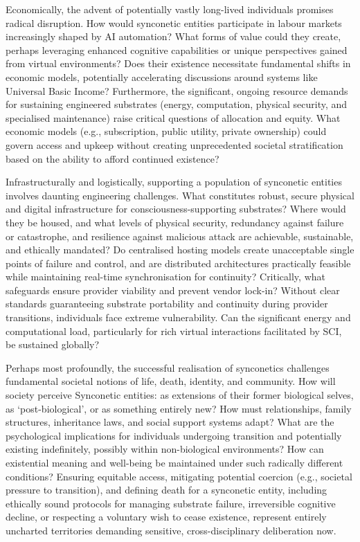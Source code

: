 \documentclass[10pt]{article}
\begin{document}
\begin{sloppypar}
  Economically, the advent of potentially vastly long-lived individuals promises radical disruption. How would synconetic entities participate in labour markets increasingly shaped by AI automation? What forms of value could they create, perhaps leveraging enhanced cognitive capabilities or unique perspectives gained from virtual environments? Does their existence necessitate fundamental shifts in economic models, potentially accelerating discussions around systems like Universal Basic Income? Furthermore, the significant, ongoing resource demands for sustaining engineered substrates (energy, computation, physical security, and specialised maintenance) raise critical questions of allocation and equity. What economic models (e.g., subscription, public utility, private ownership) could govern access and upkeep without creating unprecedented societal stratification based on the ability to afford continued existence?

  Infrastructurally and logistically, supporting a population of synconetic entities involves daunting engineering challenges. What constitutes robust, secure physical and digital infrastructure for consciousness-supporting substrates? Where would they be housed, and what levels of physical security, redundancy against failure or catastrophe, and resilience against malicious attack are achievable, sustainable, and ethically mandated? Do centralised hosting models create unacceptable single points of failure and control, and are distributed architectures practically feasible while maintaining real-time synchronisation for continuity? Critically, what safeguards ensure provider viability and prevent vendor lock-in? Without clear standards guaranteeing substrate portability and continuity during provider transitions, individuals face extreme vulnerability. Can the significant energy and computational load, particularly for rich virtual interactions facilitated by SCI, be sustained globally?

  Perhaps most profoundly, the successful realisation of synconetics challenges fundamental societal notions of life, death, identity, and community. How will society perceive Synconetic entities: as extensions of their former biological selves, as ‘post-biological’, or as something entirely new? How must relationships, family structures, inheritance laws, and social support systems adapt? What are the psychological implications for individuals undergoing transition and potentially existing indefinitely, possibly within non-biological environments? How can existential meaning and well-being be maintained under such radically different conditions? Ensuring equitable access, mitigating potential coercion (e.g., societal pressure to transition), and defining death for a synconetic entity, including ethically sound protocols for managing substrate failure, irreversible cognitive decline, or respecting a voluntary wish to cease existence, represent entirely uncharted territories demanding sensitive, cross-disciplinary deliberation now.


\end{sloppypar}
\end{document}
